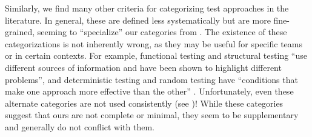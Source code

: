 \begin{itemize}
          Similarly, we find many other
          criteria for categorizing test approaches in the literature.
          In general, these are defined less systematically but are more
          fine-grained, seeming to ``specialize'' our categories from
          . The existence of these categorizations is not
          inherently wrong, as they may be useful for specific teams or in
          certain contexts. For example, functional testing and structural
          testing ``use different sources of information and have been shown to
          highlight different problems'', and deterministic testing and random
          testing have ``conditions that make one approach more effective than
          the other'' \citep[p.~5\=/16]{SWEBOK2025}. Unfortunately, even these
          alternate categories are not used consistently
          (see )! While these categories suggest
          that ours are not complete or minimal, they seem to be supplementary
          and generally do not conflict with them.
\end{itemize}

\begin{landscape}%
    \otherCatsTable{}%
\end{landscape}

